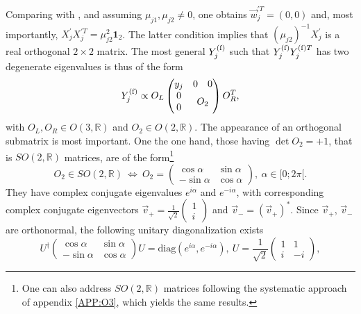 \documentclass[12pt,a4paper]{article}
\begin{document}
Comparing  with , and assuming $\mu_{j1},\mu_{j2}\neq 0$, one obtains $\vec w_j^{\prime T}=(0, 0)$ and, most importantly, $X_j^\prime X_j^{\prime T}=\mu_{j2}^2\mathbf{1}_2$. The latter condition implies that $(\mu_{j2})^{-1}X_j^\prime$ is a real orthogonal $2\times 2$ matrix. The most general $Y_{j}^{\rm (f)}$ such that $Y_{j}^{\rm (f)}Y_{j}^{{\rm (f)}T}$ has two degenerate eigenvalues is thus of the form
\begin{equation}
Y_{j}^{\rm (f)}\propto O_L\begin{pmatrix}y_j & \begin{matrix}0&0\end{matrix}\\ \begin{matrix}0\\ 0\end{matrix} & O_2\end{pmatrix}O_R^{T},
\end{equation}
with $O_L,O_R\in O(3,\mathbb{R})$ and $O_2\in O(2,\mathbb{R})$. The appearance of an orthogonal submatrix is most important. One the one hand, those having $\det O_2=+1$, that is $SO(2,\mathbb{R})$ matrices, are of the form\footnote{One can also address $SO(2,\mathbb{R})$ matrices following the systematic approach of appendix \ref{APP:O3}, which yields the same results.}
\begin{equation}
 O_2\in SO(2,\mathbb{R})\ \Leftrightarrow\ O_2=\begin{pmatrix}\cos \alpha & \sin\alpha\\ -\sin\alpha&\cos\alpha\end{pmatrix},\ \alpha\in [0;2\pi[.
\end{equation}
They have complex conjugate eigenvalues $e^{i\alpha}$ and $e^{-i\alpha}$, with corresponding complex conjugate eigenvectors $\vec v_+=\frac{1}{\sqrt 2}\left(\begin{smallmatrix}1\\ i\end{smallmatrix}\right)$ and $\vec v_-=(\vec v_+)^\ast$. Since $\vec v_+$, $\vec v_-$ are orthonormal, the following unitary diagonalization exists
\begin{equation}\label{eq:SO2R:diag}
 U^\dagger\begin{pmatrix}\cos \alpha & \sin\alpha\\ -\sin\alpha&\cos\alpha\end{pmatrix}U=\text{diag}(e^{i\alpha},e^{-i\alpha}),\ U=\frac{1}{\sqrt{2}}\begin{pmatrix}1 & 1\\ i& -i\end{pmatrix},
\end{equation}
\end{document}
